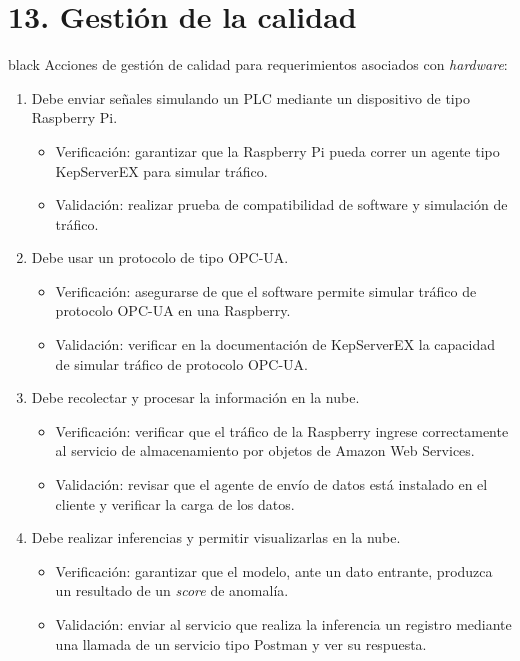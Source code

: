 \documentclass[11pt]{charter}
\begin{document}
\section{13. Gestión de la calidad}
\label{sec:calidad}
\begin{consigna}{black}
Acciones de gestión de calidad para requerimientos asociados con \textit{hardware}:

	\begin{enumerate}
	\item Debe enviar señales simulando un PLC mediante un dispositivo de tipo Raspberry Pi.
	\begin{itemize}
	\item Verificación: garantizar que la Raspberry Pi pueda correr un agente tipo KepServerEX para simular tráfico. 
	\item Validación: realizar prueba de compatibilidad de software y simulación de tráfico.
	\end{itemize}
	
	\item Debe usar un protocolo de tipo OPC-UA.
		\begin{itemize}
	\item Verificación: asegurarse de que el software permite simular tráfico de protocolo OPC-UA en una Raspberry.
	\item Validación: verificar en la documentación de KepServerEX la capacidad de simular tráfico  de protocolo OPC-UA.
	\end{itemize}

	\item Debe recolectar y procesar la información en la nube.
		\begin{itemize}
	\item Verificación: verificar que el tráfico de la Raspberry ingrese correctamente al servicio de almacenamiento por objetos de Amazon Web Services.
	\item Validación: revisar que el agente de envío de datos está instalado en el cliente y verificar la carga de los datos.
	\end{itemize}

	\item Debe realizar inferencias y permitir visualizarlas en la nube.
		\begin{itemize}
	\item Verificación: garantizar que el modelo, ante un dato entrante, produzca un resultado de un \textit{score} de anomalía.
	\item Validación: enviar al servicio que realiza la inferencia un registro mediante una llamada de un servicio tipo Postman y ver su respuesta.
	\end{itemize}


\end{enumerate}
\end{consigna}
\end{document}
